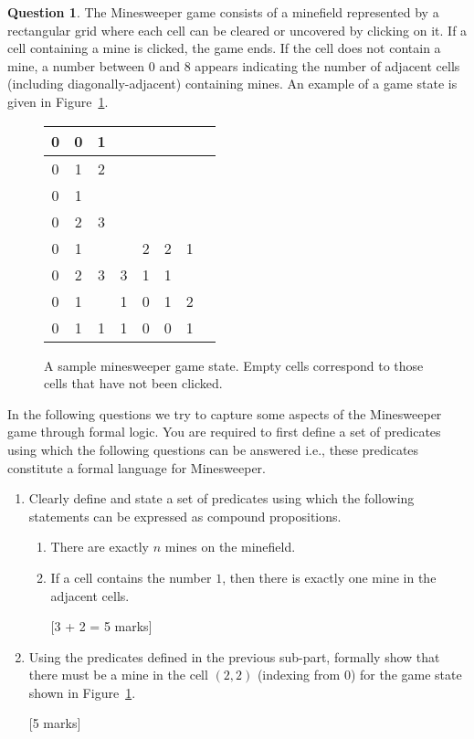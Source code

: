 \documentclass[a4paper]{article}
\theoremstyle{definition}
\newtheorem{question}{Question}
\newcommand{\qmarks}[1]{{\hspace*{\fill} [#1 marks]}}
\begin{document}
\begin{question}
    The Minesweeper game consists of a minefield represented by a rectangular grid where each cell can be cleared or uncovered by clicking on it.
    If a cell containing a mine is clicked, the game ends.
    If the cell does not contain a mine, a number between 0 and 8 appears indicating the number of adjacent cells (including diagonally-adjacent) containing mines.
    An example of a game state is given in Figure~\ref{fig:minesweeper_game_state}.

    \begin{figure}[h]
	\centering
	\begin{tabular}{|c|c|c|c|c|c|c|c|}
	    \hline
	    0 & 0 & 1 & & & & & \\
	    \hline
	    0 & 1 & 2 & & & & & \\
	    \hline
	    0 & 1 & & & & & & \\
	    \hline
	    0 & 2 & 3 & & & & & \\
	    \hline
	    0 & 1 & & & 2 & 2 & 1 & \\
	    \hline
	    0 & 2 & 3 & 3 & 1 & 1 & & \\
	    \hline
	    0 & 1 & & 1 & 0 & 1 & 2 & \\
	    \hline
	    0 & 1 & 1 & 1 & 0 & 0 & 1 & \\
	    \hline
	\end{tabular}
	\caption{A sample minesweeper game state. Empty cells correspond to those cells that have not been clicked.}%
	\label{fig:minesweeper_game_state}
    \end{figure}

    In the following questions we try to capture some aspects of the Minesweeper game through formal logic.
    You are required to first define a set of predicates using which the following questions can be answered i.e., these predicates constitute a formal language for Minesweeper.

    \begin{enumerate}
	    \item Clearly define and state a set of predicates using which the following statements can be expressed as compound propositions.
		\begin{enumerate}
			\item There are exactly $n$ mines on the minefield.
			\item If a cell contains the number $1$, then there is exactly one mine in the adjacent cells.

			\qmarks{3 + 2 = 5}
		\end{enumerate}

	    \item Using the predicates defined in the previous sub-part, formally show that there must be a mine in the cell $(2, 2)$ (indexing from $0$) for the game state shown in Figure~\ref{fig:minesweeper_game_state}.

		\qmarks{5}
    \end{enumerate}
\end{question}
\end{document}
